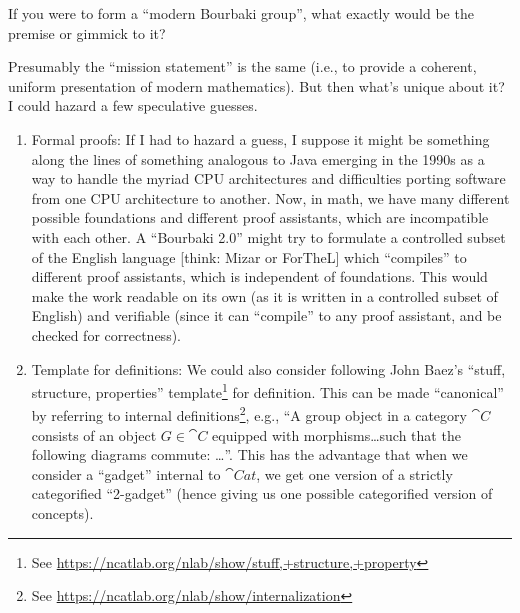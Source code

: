 \begin{puzzle}[{``Bourbaki 2.0''}]
If you were to form a ``modern Bourbaki group'', what exactly would be
the premise or gimmick to it?

Presumably the ``mission statement'' is the same (i.e., to provide a
coherent, uniform presentation of modern mathematics). But then what's
unique about it? I could hazard a few speculative guesses.

\begin{enumerate}
\item Formal proofs: If I had to hazard a guess, I suppose it might be something along the
lines of something analogous to Java emerging in the 1990s as a way to
handle the myriad CPU architectures and difficulties porting software
from one CPU architecture to another. Now, in math, we have many
different possible foundations and different proof assistants, which are
incompatible with each other. A ``Bourbaki 2.0'' might try to formulate
a controlled subset of the English language [think: Mizar or ForTheL]
which ``compiles'' to different proof assistants, which is independent
of foundations. This would make the work readable on its own (as it is
written in a controlled subset of English) and verifiable (since it can
``compile'' to any proof assistant, and be checked for correctness).

\item Template for definitions:
  We could also consider following John Baez's ``stuff, structure,
properties'' template\footnote{See \url{https://ncatlab.org/nlab/show/stuff,+structure,+property}} for definition. This can be made ``canonical'' by
referring to internal definitions\footnote{See \url{https://ncatlab.org/nlab/show/internalization}},
e.g., ``A group object in a category $\cat{C}$ consists of an object
$G\in\cat{C}$ equipped with morphisms\dots such that the following
diagrams commute: \dots''. This has the advantage that when we consider
a ``gadget'' internal to $\cat{Cat}$, we get one version of a strictly
categorified ``2-gadget'' (hence giving us one possible categorified
version of concepts).
\end{enumerate}
\end{puzzle}

